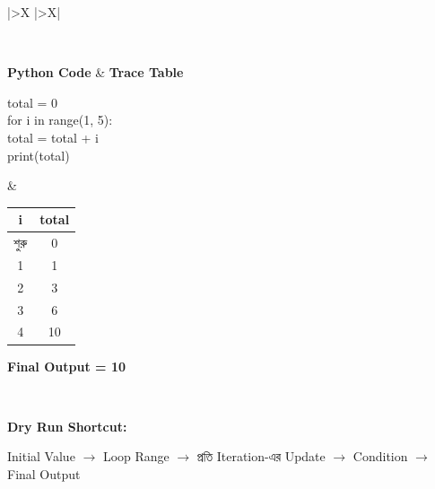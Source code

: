 
\begin{tabularx}{\linewidth}{
|>{\RaggedRight\arraybackslash}X
|>{\RaggedRight\arraybackslash}X|
}
\hline

\\
\hline

\textbf{\color{darkTeal}Python Code}
&
\textbf{\color{darkTeal}Trace Table}
\\
\hline

\begin{minipage}[t]{\linewidth}
\vspace{0pt}

\begin{english}
\ttfamily
total = 0\\[0.5mm]
for i in range(1, 5):\\
\hspace*{4mm}total = total + i\\[0.5mm]
print(total)
\end{english}

\end{minipage}
&
\begin{minipage}[t]{\linewidth}
\vspace{0pt}

\centering

\begin{tabular}{|c|c|}
\hline
\textbf{i} & \textbf{total} \\
\hline
শুরু & 0 \\
\hline
1 & 1 \\
\hline
2 & 3 \\
\hline
3 & 6 \\
\hline
4 & 10 \\
\hline
\end{tabular}

\medskip

\textbf{Final Output = 10}

\end{minipage}
\\
\hline

\end{tabularx}

\begin{rememberbox}

\textbf{Dry Run Shortcut:}

\begin{center}

Initial Value
\(\rightarrow\)
Loop Range
\(\rightarrow\)
প্রতি Iteration-এর Update
\(\rightarrow\)
Condition
\(\rightarrow\)
Final Output

\end{center}

\end{rememberbox}

